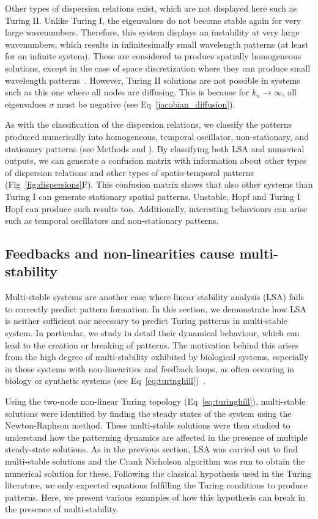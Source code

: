 Other types of dispersion relations exist, which are not displayed here such as Turing II. Unlike Turing I, the eigenvalues do not become stable again for very large wavenumbers.
Therefore, this system displays an instability at very large wavenumbers, which results in infinitesimally small wavelength patterns (at least for an infinite system). These are considered to produce spatially homogeneous solutions, except in the case of space discretization where they can produce small wavelength patterns~\parencite{Wang2022}.
However, Turing II solutions are not possible in systems such as this one where all nodes are diffusing.
This is because for $k_n \rightarrow \infty$, all eigenvalues $\sigma$ must be negative (see Eq~\ref{jacobian_diffusion}).

As with the classification of the dispersion relations, we classify the patterns produced numerically into homogeneous, temporal oscillator, non-stationary, and stationary patterns (see Methods and ).
By classifying both LSA and numerical outputs, we can generate a confusion matrix with information about other types of dispersion relations and other types of spatio-temporal patterns (Fig~\ref{fig:dispersions}F). This confusion matrix shows that also other systems than Turing I can generate stationary spatial patterns. Unstable, Hopf and Turing I Hopf can produce such results too. Additionally, interesting behaviours can arise such as temporal oscillators and non-stationary patterns.


\subsection*{Feedbacks and non-linearities cause multi-stability}

Multi-stable systems are another case where linear stability analysis (LSA) fails to correctly predict pattern formation.  In this section, we demonstrate how LSA is neither sufficient 
nor necessary to predict Turing patterns in multi-stable system. In particular, we study in detail their dynamical behaviour, which can lead to the creation or breaking of patterns.
The motivation behind this arises from the high degree of multi-stability exhibited by biological systems, especially in those systems with non-linearities and feedback loops, as often occuring in biology or synthetic systems (see Eq~\ref{eq:turinghill})~\parencite{pham2020complexity, leite2009multistability}.

Using the two-node non-linear Turing topology (Eq~\ref{eq:turinghill}), multi-stable solutions were identified by finding the steady states of the system using the Newton-Raphson method. These multi-stable solutions were then studied to understand how the patterning dynamics are affected in the presence of multiple steady-state solutions.
As in the previous section, LSA was carried out to find multi-stable solutions and the Crank Nicholson algorithm was run to obtain the numerical solution for these.
Following the classical hypothesis used in the Turing literature, we only expected equations fulfilling the Turing conditions to produce patterns.
Here, we present various examples of how this hypothesis can break in the presence of multi-stability.

